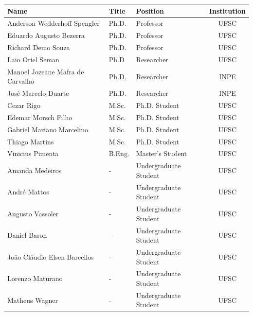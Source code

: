 \begin{table}[ht]
    \centering
    \begin{tabular}{lllc}
        \toprule[1.5pt]
        \textbf{Name} & \textbf{Title} & \textbf{Position} & \textbf{Institution} \\
        \midrule
        Anderson Wedderhoff Spengler        & Ph.D.     & Professor             & UFSC \\
        Eduardo Augusto Bezerra             & Ph.D.     & Professor             & UFSC \\
        Richard Demo Souza                  & Ph.D.     & Professor             & UFSC \\
        Laio Oriel Seman                    & Ph.D      & Researcher            & UFSC \\
        Manoel Jozeane Mafra de Carvalho    & Ph.D.     & Researcher            & INPE \\
        José Marcelo Duarte                 & Ph.D.     & Researcher            & INPE \\
        Cezar Rigo                          & M.Sc.     & Ph.D. Student         & UFSC \\
        Edemar Morsch Filho                 & M.Sc.     & Ph.D. Student         & UFSC \\
        Gabriel Mariano Marcelino           & M.Sc.     & Ph.D. Student         & UFSC \\
        Thiago Martins                      & M.Sc.     & Ph.D. Student         & UFSC \\
        Vinicius Pimenta                    & B.Eng.    & Master's Student      & UFSC \\
        Amanda Medeiros                     & -         & Undergraduate Student & UFSC \\
        André Mattos                        & -         & Undergraduate Student & UFSC \\
        Augusto Vassoler                    & -         & Undergraduate Student & UFSC \\
        Daniel Baron                        & -         & Undergraduate Student & UFSC \\
        João Cláudio Elsen Barcellos        & -         & Undergraduate Student & UFSC \\
        Lorenzo Maturano                    & -         & Undergraduate Student & UFSC \\
        Matheus Wagner                      & -         & Undergraduate Student & UFSC \\

\end{tabular}
\end{table}
